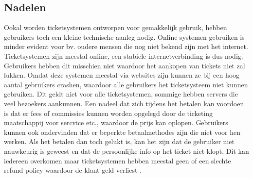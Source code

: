 \subsection{Nadelen}
Ookal worden ticketsystemen ontworpen voor gemakkelijk gebruik, hebben gebruikers toch een kleine technische aanleg nodig. Online systemen gebruiken is minder evident voor bv. oudere mensen die nog niet bekend zijn met het internet.
Ticketsystemen zijn meestal online, een stabiele internetverbinding is dus nodig. Gebruikers hebben dit misschien niet waardoor het aankopen van tickets niet zal lukken. 
Omdat deze systemen meestal via websites zijn kunnen ze bij een hoog aantal gebruikers crashen, waardoor alle gebruikers het ticketsysteem niet kunnen gebruiken. Dit geldt niet voor alle ticketsystemen, sommige hebben servers die veel bezoekers aankunnen.
Een nadeel dat zich tijdens het betalen kan voordoen is dat er fees of commissies kunnen worden opgelegd door de ticketing maatschappij voor sercvice etc., waardoor de prijs kan oplopen. Gebruikers kunnen ook ondervinden dat er beperkte betaalmethodes zijn die niet voor hen werken. 
Als het betalen dan toch gelukt is, kan het zijn dat de gebruiker niet nauwkeurig is geweest en dat de persoonlijke info op het ticket niet klopt.
Dit kan iedereen overkomen maar ticketsystemen hebben meestal geen of een slechte refund policy waardoor de klant geld verliest \cite{concert-tickets-online2021}. 

